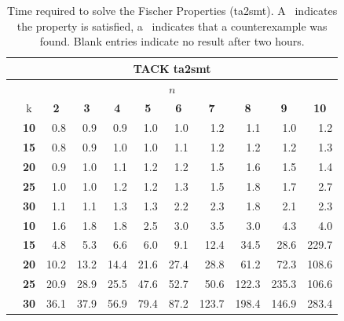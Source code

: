 \documentclass[a4paper,11pt]{report}
\newcommand*\cmark{\small\Checkmark}
\newcommand*{\xmark}{\small\XSolidBrush}
\theoremstyle{definition}
\begin{document}
\begin{table}
\footnotesize
{}
\centering
\caption[Time required to solve the Fischer Properties (ta2smt)]{Time required to solve the Fischer Properties (ta2smt). A \cmark\
  indicates the property is satisfied, a \xmark\ indicates that a counterexample
  was found. Blank entries indicate no result after two hours.}
\label{table:fischer-results-ta2smt}
\begin{tabular}{c c r r r r r r r r r}
\midrule
\multicolumn{11}{c}{TACK ta2smt} \\
\midrule
\multicolumn{11}{c}{\(n\)} \\
\midrule
& k & \multicolumn{1}{c}{\textbf{2}} & \multicolumn{1}{c}{\textbf{3}} & \multicolumn{1}{c}{\textbf{4}} & \multicolumn{1}{c}{\textbf{5}} & \multicolumn{1}{c}{\textbf{6}} & \multicolumn{1}{c}{\textbf{7}} & \multicolumn{1}{c}{\textbf{8}} & \multicolumn{1}{c}{\textbf{9}} & \multicolumn{1}{c}{\textbf{10}} \\
\midrule
\multirow{5}{1em}{\rotatebox{90}{\textbf{live-one\ }}}
 & \textbf{10} & 0.8\cmark & 0.9\cmark & 0.9\cmark & 1.0\cmark & 1.0\cmark & 1.2\cmark & 1.1\cmark & 1.0\cmark & 1.2\cmark \\
 & \textbf{15} & 0.8\cmark & 0.9\cmark & 1.0\cmark & 1.0\cmark & 1.1\cmark & 1.2\cmark & 1.2\cmark & 1.2\cmark & 1.3\cmark \\
 & \textbf{20} & 0.9\cmark & 1.0\cmark & 1.1\cmark & 1.2\cmark & 1.2\cmark & 1.5\cmark & 1.6\cmark & 1.5\cmark & 1.4\cmark \\
 & \textbf{25} & 1.0\cmark & 1.0\cmark & 1.2\cmark & 1.2\cmark & 1.3\cmark & 1.5\cmark & 1.8\cmark & 1.7\cmark & 2.7\cmark \\
 & \textbf{30} & 1.1\cmark & 1.1\cmark & 1.3\cmark & 1.3\cmark & 2.2\cmark & 2.3\cmark & 1.8\cmark & 2.1\cmark & 2.3\cmark \\
  \midrule
\multirow{5}{1em}{\rotatebox{90}{\textbf{live-two\ }}}
  & \textbf{10} & 1.6\cmark & 1.8\cmark & 1.8\cmark & 2.5\cmark & 3.0\cmark & 3.5\cmark & 3.0\cmark & 4.3\cmark & 4.0\cmark \\
  & \textbf{15} & 4.8\cmark & 5.3\cmark & 6.6\cmark & 6.0\cmark & 9.1\cmark & 12.4\cmark & 34.5\cmark & 28.6\cmark & 229.7\cmark \\
  & \textbf{20} & 10.2\cmark & 13.2\cmark & 14.4\cmark & 21.6\cmark & 27.4\cmark & 28.8\cmark & 61.2\cmark & 72.3\cmark & 108.6\cmark \\
  & \textbf{25} & 20.9\cmark & 28.9\cmark & 25.5\cmark & 47.6\cmark & 52.7\cmark & 50.6\cmark & 122.3\cmark & 235.3\cmark & 106.6\cmark \\
  & \textbf{30} & 36.1\cmark & 37.9\cmark & 56.9\cmark & 79.4\cmark & 87.2\cmark & 123.7\cmark & 198.4\cmark & 146.9\cmark & 283.4\cmark \\
  \midrule


\end{tabular}
\end{table}
\end{document}
